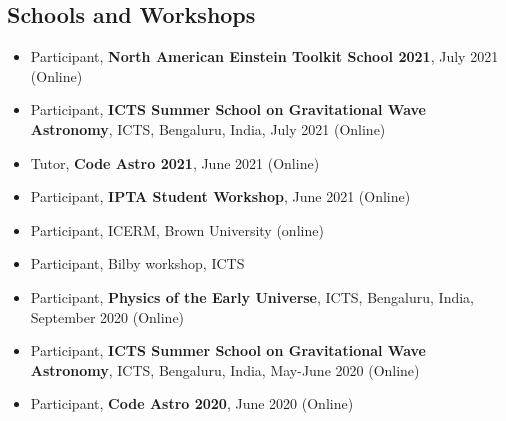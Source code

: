 \documentclass[margin, centered]{res}
\begin{document}
\begin{resume}
\section{Schools and Workshops}
\begin{itemize}[leftmargin=*]
    \item Participant, \textbf{North American Einstein Toolkit School 2021}, July 2021 (Online)
	\item Participant, \textbf{ICTS Summer School on Gravitational Wave Astronomy}, ICTS, Bengaluru, India, July 2021 (Online)
	\item Tutor, \textbf{Code Astro 2021}, June 2021 (Online)
	\item Participant, \textbf{IPTA Student Workshop}, June 2021 (Online) 
	\item Participant, ICERM, Brown University (online)
	\item Participant, Bilby workshop, ICTS 
	\item Participant, \textbf{Physics of the Early Universe}, ICTS, Bengaluru, India, September 2020 (Online)
	\item Participant, \textbf{ICTS Summer School on Gravitational Wave Astronomy}, ICTS, Bengaluru, India, May-June 2020 (Online)
	\item Participant, \textbf{Code Astro 2020}, June 2020 (Online)
\end{itemize}







\end{resume}
\end{document}
